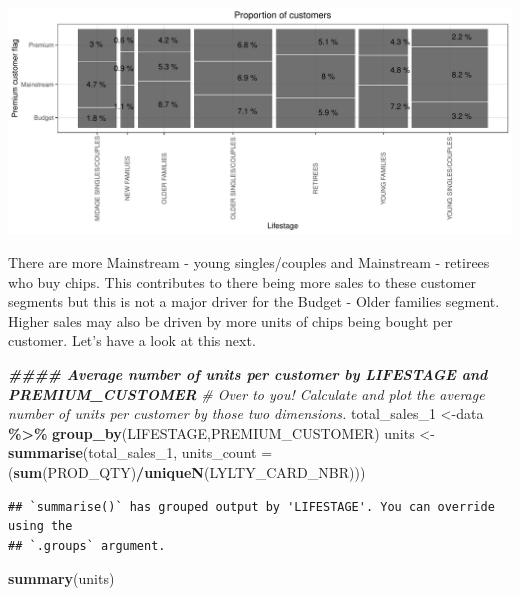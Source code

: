 \documentclass[
]{article}
\newenvironment{Shaded}{\begin{snugshade}}{\end{snugshade}}
\newcommand{\AttributeTok}[1]{\textcolor[rgb]{0.13,0.29,0.53}{#1}}
\newcommand{\CommentTok}[1]{\textcolor[rgb]{0.56,0.35,0.01}{\textit{#1}}}
\newcommand{\DocumentationTok}[1]{\textcolor[rgb]{0.56,0.35,0.01}{\textbf{\textit{#1}}}}
\newcommand{\FunctionTok}[1]{\textcolor[rgb]{0.13,0.29,0.53}{\textbf{#1}}}
\newcommand{\NormalTok}[1]{#1}
\newcommand{\OtherTok}[1]{\textcolor[rgb]{0.56,0.35,0.01}{#1}}
\newcommand{\SpecialCharTok}[1]{\textcolor[rgb]{0.81,0.36,0.00}{\textbf{#1}}}
\begin{document}
\begin{center}\includegraphics{InsideSherpa_Task1_files/figure-latex/unnamed-chunk-15-1} \end{center}

There are more Mainstream - young singles/couples and Mainstream -
retirees who buy chips. This contributes to there being more sales to
these customer segments but this is not a major driver for the Budget -
Older families segment. Higher sales may also be driven by more units of
chips being bought per customer. Let's have a look at this next.

\begin{Shaded}
\begin{Highlighting}[]
\DocumentationTok{\#\#\#\# Average number of units per customer by LIFESTAGE and PREMIUM\_CUSTOMER}
\CommentTok{\# Over to you! Calculate and plot the average number of units per customer by those two dimensions.}
\NormalTok{total\_sales\_1 }\OtherTok{\textless{}{-}}\NormalTok{data }\SpecialCharTok{\%\textgreater{}\%} \FunctionTok{group\_by}\NormalTok{(LIFESTAGE,PREMIUM\_CUSTOMER)}
\NormalTok{units }\OtherTok{\textless{}{-}}  \FunctionTok{summarise}\NormalTok{(total\_sales\_1, }\AttributeTok{units\_count =}\NormalTok{ (}\FunctionTok{sum}\NormalTok{(PROD\_QTY)}\SpecialCharTok{/}\FunctionTok{uniqueN}\NormalTok{(LYLTY\_CARD\_NBR)))}
\end{Highlighting}
\end{Shaded}

\begin{verbatim}
## `summarise()` has grouped output by 'LIFESTAGE'. You can override using the
## `.groups` argument.
\end{verbatim}

\begin{Shaded}
\begin{Highlighting}[]
\FunctionTok{summary}\NormalTok{(units)}
\end{Highlighting}
\end{Shaded}
\end{document}
